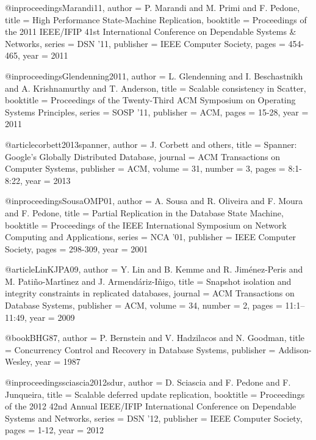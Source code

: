 @inproceedings{Marandi11,
   author    = {P. Marandi and M. Primi and F. Pedone},
   title     = {High Performance State-Machine Replication},
   booktitle = {Proceedings of the 2011 IEEE/IFIP 41st International Conference on Dependable Systems \& Networks},
   series    = {DSN '11},
   publisher = {{IEEE} Computer Society},
   pages     = {454-465},
   year      = {2011}
}

@inproceedings{Glendenning2011,
   author    = {L. Glendenning and I. Beschastnikh and A. Krishnamurthy and T. Anderson},
   title     = {Scalable consistency in {Scatter}},
   booktitle = {Proceedings of the Twenty-Third ACM Symposium on Operating Systems Principles},
   series    = {SOSP '11},
   publisher = {ACM},
   pages     = {15-28},
   year      = {2011}
}

@article{corbett2013spanner,
   author    = {J. Corbett and others},
   title     = {Spanner: Google's Globally Distributed Database},
   journal   = {ACM Transactions on Computer Systems},
   publisher = {ACM},
   volume    = {31},
   number    = {3},
   pages     = {8:1-8:22},
   year      = {2013}
}

@inproceedings{SousaOMP01,
   author    = {A. Sousa and R. Oliveira and F. Moura and F. Pedone},
   title     = {Partial Replication in the Database State Machine},
   booktitle = {Proceedings of the IEEE International Symposium on Network Computing and Applications},
   series    = {NCA '01},
   publisher = {{IEEE} Computer Society},
   pages     = {298-309},
   year      = {2001}
}

@article{LinKJPA09,
   author    = {Y. Lin and B. Kemme and R. Jim{\'e}nez-Peris and M. Pati{\~n}o-Mart\'{\i}nez and J. Armend{\'a}riz-I{\~n}igo},
   title     = {Snapshot isolation and integrity constraints in replicated databases},
   journal   = {ACM Transactions on Database Systems},
   publisher = {ACM},
   volume    = {34},
   number    = {2},
   pages     = {11:1--11:49},
   year      = {2009}
}


@book{BHG87,
	author    = {P. Bernstein and V. Hadzilacos and N. Goodman},
	title     = {Concurrency Control and Recovery in Database Systems},
	publisher = {Addison-Wesley},
	year      = {1987}
}

@inproceedings{sciascia2012sdur,
   author    = {D. Sciascia and F. Pedone and F. Junqueira},
   title     = {Scalable deferred update replication},
   booktitle = {Proceedings of the 2012 42nd Annual IEEE/IFIP International Conference on Dependable Systems and Networks},
   series    = {DSN '12},
   publisher = {{IEEE} Computer Society},
   pages     = {1-12},
   year      = {2012}
}

